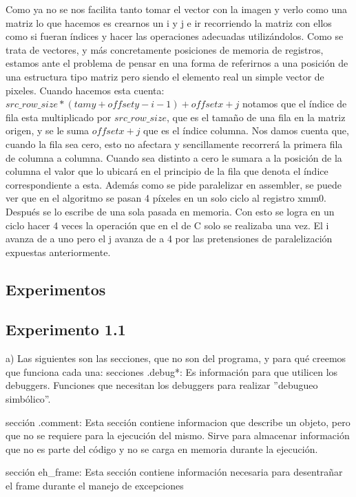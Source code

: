 ﻿\documentclass[a4paper]{article}
\begin{document}
	Como ya no se nos facilita tanto tomar el vector con la imagen y verlo como una matriz lo que hacemos es crearnos un i y j e ir recorriendo la matriz con ellos como si fueran \'indices y hacer las operaciones adecuadas utilizándolos. Como se trata de vectores, y m\'as concretamente posiciones de memoria de registros, estamos ante el problema de pensar en una forma de referirnos a una posici\'on de una estructura tipo matriz pero siendo el elemento real un simple vector de pixeles.  Cuando hacemos esta cuenta:$src\_row\_size*(tamy+offsety-i-1)+offsetx+j$ notamos que el \'indice de fila esta multiplicado por $src\_row\_size$, que es el tamaño de una fila en la matriz origen, y se le suma $offsetx+j$ que es el \'indice columna. Nos damos cuenta que, cuando la fila sea cero, esto no afectara y sencillamente recorrerá la primera fila de columna a columna. Cuando sea distinto a cero le sumara a la posici\'on de la columna el valor que lo ubicará en el principio de la fila que denota el \'indice correspondiente a esta. Además como se pide paralelizar en assembler, se puede ver que en el algoritmo se pasan 4 píxeles en un solo ciclo al registro xmm0. Después se lo escribe de una sola pasada en memoria. Con esto se logra en un ciclo hacer 4 veces la operaci\'on que en el de C solo se realizaba una vez. El i avanza de a uno pero el j avanza de a 4 por las pretensiones de paralelizaci\'on expuestas anteriormente.
\ \\


\subsection{Experimentos}
\subsection{Experimento 1.1}

a) Las siguientes son las secciones, que no son del programa, y para qué creemos que funciona cada una: 
secciones .debug*: Es informaci\'on para que utilicen los debuggers. Funciones que necesitan los debuggers para realizar ''debugueo simb\'olico''.  

sección .comment: Esta sección contiene informacion que describe un objeto, pero que no se requiere para la ejecución del mismo. Sirve para almacenar información que no es parte del código y no se carga en memoria durante la ejecución. 

sección eh_frame: Esta secci\'on contiene informaci\'on necesaria para desentrañar el frame durante el manejo de excepciones
	
\end{document}
